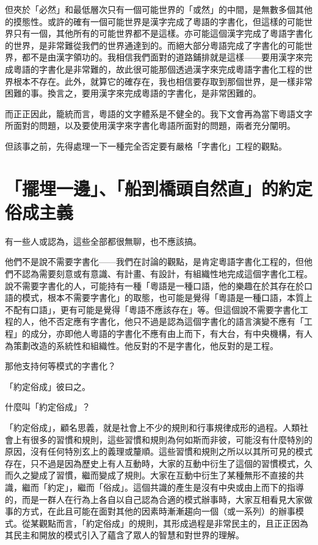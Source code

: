\documentclass[a5paper, 12pt, openany]{book} %
\begin{document}
但夾於「必然」和最低層次只有一個可能世界的「或然」的中間，是無數多個其他的摸態性。或許的確有一個可能世界是漢字完成了粵語的字書化，但這樣的可能世界只有一個，其他所有的可能世界都不是這樣。亦可能這個漢字完成了粵語字書化的世界，是非常難從我們的世界通達到的。而絕大部分粵語完成了字書化的可能世界，都不是由漢字領功的。我相信我們面對的道路鋪排就是這樣——要用漢字來完成粵語的字書化是非常難的，故此很可能那個透過漢字來完成粵語字書化工程的世界根本不存在。此外，就算它的確存在，我也相信要存取到那個世界，是一樣非常困難的事。換言之，要用漢字來完成粵語的字書化，是非常困難的。 

而正正因此，籠統而言，粵語的文字體系是不健全的。我下文會再為當下粵語文字所面對的問題，以及要使用漢字來字書化粵語所面對的問題，兩者充分闡明。

但該事之前，先得處理一下一種完全否定要有嚴格「字書化」工程的觀點。

\section{「擺埋一邊」、「船到橋頭自然直」的約定俗成主義}

有一些人或認為，這些全部都很無聊，也不應該搞。

他們不是說不需要字書化——我們在討論的觀點，是肯定粵語字書化工程的，但他們不認為需要刻意或有意識、有計畫、有設計，有組織性地完成這個字書化工程。說不需要字書化的人，可能持有一種「粵語是一種口語，他的樂趣在於其存在於口語的模式，根本不需要字書化」的取態，也可能是覺得「粵語是一種口語，本質上不配有口語」，更有可能是覺得「粵語不應該存在」等。但這個說不需要字書化工程的人，他不否定應有字書化，他只不過是認為這個字書化的語言演變不應有「工程」的成分，亦即他人粵語的字書化不應有由上而下，有大台，有中央機構，有人為策劃改造的系統性和組織性。他反對的不是字書化，他反對的是工程。

那他支持何等模式的字書化？

「約定俗成」彼曰之。

什麼叫「約定俗成」？

「約定俗成」，顧名思義，就是社會上不少的規則和行事規律成形的過程。人類社會上有很多的習慣和規則，這些習慣和規則為何如斯而非彼，可能沒有什麼特別的原因，沒有任何特別玄上的義理或釐順。這些習慣和規則之所以以其所可見的模式存在，只不過是因為歷史上有人互動時，大家的互動中衍生了這個的習慣模式，久而久之變成了習慣，繼而變成了規則。大家在互動中衍生了某種無形不直接的共識，繼而「約定」，繼而「俗成」。這個共識的產生是沒有中央或由上而下的指導的，而是一群人在行為上各自以自己認為合適的模式辦事時，大家互相看見大家做事的方式，在此且可能在面對其他的因素時漸漸趨向一個（或一系列）的辦事模式。從某觀點而言，「約定俗成」的規則，其形成過程是非常民主的，且正正因為其民主和開放的模式引入了蘊含了眾人的智慧和對世界的理解。
\end{document}
